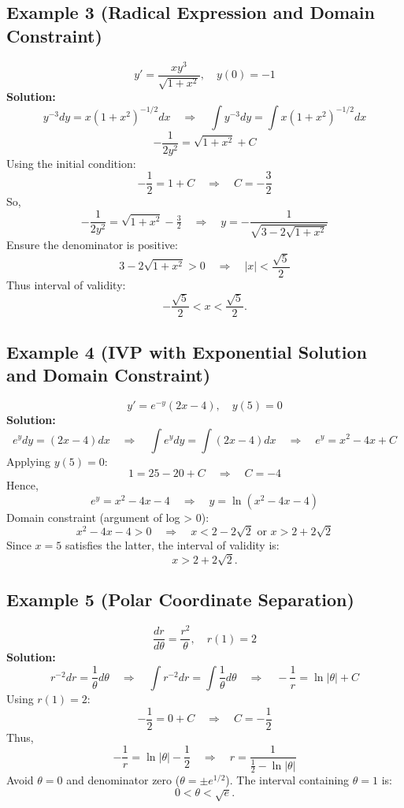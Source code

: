 \documentclass[12pt]{book}
\begin{document}
\subsection*{Example 3 (Radical Expression and Domain Constraint)}
\[
y' = \frac{x y^3}{\sqrt{1 + x^2}},\quad y(0) = -1
\]
\textbf{Solution:}
\[
y^{-3} dy = x(1 + x^2)^{-1/2} dx \quad\Longrightarrow\quad \int y^{-3} dy = \int x (1 + x^2)^{-1/2} dx
\]
\[
-\frac{1}{2y^2} = \sqrt{1 + x^2} + C
\]
Using the initial condition:
\[
- \frac{1}{2} = 1 + C \quad\Rightarrow\quad C = -\frac{3}{2}
\]
So,
\[
-\frac{1}{2y^2} = \sqrt{1 + x^2} - \tfrac{3}{2} \quad\Longrightarrow\quad y = -\frac{1}{\sqrt{3 - 2\sqrt{1 + x^2}}}
\]
Ensure the denominator is positive:
\[
3 - 2\sqrt{1 + x^2} > 0 \quad\Rightarrow\quad |x| < \frac{\sqrt{5}}{2}
\]
Thus interval of validity:
\[
-\frac{\sqrt{5}}{2} < x < \frac{\sqrt{5}}{2}.
\]

\subsection*{Example 4 (IVP with Exponential Solution and Domain Constraint)}
\[
y' = e^{-y}(2x - 4),\quad y(5) = 0
\]
\textbf{Solution:}
\[
e^y dy = (2x - 4) dx \quad\Longrightarrow\quad \int e^y dy = \int (2x - 4) dx \quad\Longrightarrow\quad e^y = x^2 - 4x + C
\]
Applying \(y(5)=0\):
\[
1 = 25 - 20 + C \quad\Rightarrow\quad C = -4
\]
Hence,
\[
e^y = x^2 - 4x - 4 \quad\Longrightarrow\quad y = \ln(x^2 - 4x - 4)
\]
Domain constraint (argument of log > 0):
\[
x^2 - 4x - 4 > 0 \quad\Rightarrow\quad x < 2 - 2\sqrt{2} \text{ or } x > 2 + 2\sqrt{2}
\]
Since \(x = 5\) satisfies the latter, the interval of validity is:
\[
x > 2 + 2\sqrt{2}.
\]

\subsection*{Example 5 (Polar Coordinate Separation)}
\[
\frac{dr}{d\theta} = \frac{r^2}{\theta},\quad r(1) = 2
\]
\textbf{Solution:}
\[
r^{-2} dr = \frac{1}{\theta} d\theta \quad\Longrightarrow\quad \int r^{-2} dr = \int \frac{1}{\theta} d\theta \quad\Longrightarrow\quad -\frac{1}{r} = \ln|\theta| + C
\]
Using \(r(1)=2\):
\[
-\frac{1}{2} = 0 + C \quad\Rightarrow\quad C = -\frac{1}{2}
\]
Thus,
\[
-\frac{1}{r} = \ln|\theta| - \frac{1}{2} \quad\Longrightarrow\quad r = \frac{1}{\frac12 - \ln|\theta|}
\]
Avoid \(\theta = 0\) and denominator zero (\(\theta = \pm e^{1/2}\)). The interval containing \(\theta=1\) is:
\[
0 < \theta < \sqrt{e}.
\]
\end{document}

